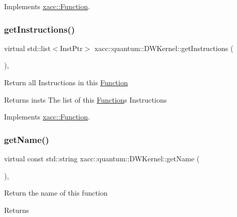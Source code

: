 Implements \hyperlink{a01151_afa549fc91b5a05f26d8139954a7e0ed5}{xacc\+::\+Function}.

\mbox{\label{a00983_abbb8f2b1c78623c377524e45d581d018}} 
\subsubsection{\texorpdfstring{get\+Instructions()}{getInstructions()}}
{\footnotesize\ttfamily virtual std\+::list$<$Inst\+Ptr$>$ xacc\+::quantum\+::\+D\+W\+Kernel\+::get\+Instructions (\begin{DoxyParamCaption}{ }\end{DoxyParamCaption})\hspace{0.3cm}{\ttfamily [inline]}, {\ttfamily [virtual]}}

Return all Instructions in this \hyperlink{a01151}{Function}

\begin{DoxyReturn}{Returns}
insts The list of this \hyperlink{a01151}{Function}\textquotesingle{}s Instructions 
\end{DoxyReturn}


Implements \hyperlink{a01151_aaf80bd3d49113a92b520785572663032}{xacc\+::\+Function}.

\mbox{\label{a00983_a7f0c4d3c73029566561cf56a474bcbbd}} 
\subsubsection{\texorpdfstring{get\+Name()}{getName()}}
{\footnotesize\ttfamily virtual const std\+::string xacc\+::quantum\+::\+D\+W\+Kernel\+::get\+Name (\begin{DoxyParamCaption}{ }\end{DoxyParamCaption})\hspace{0.3cm}{\ttfamily [inline]}, {\ttfamily [virtual]}}

Return the name of this function \begin{DoxyReturn}{Returns}

\end{DoxyReturn}


